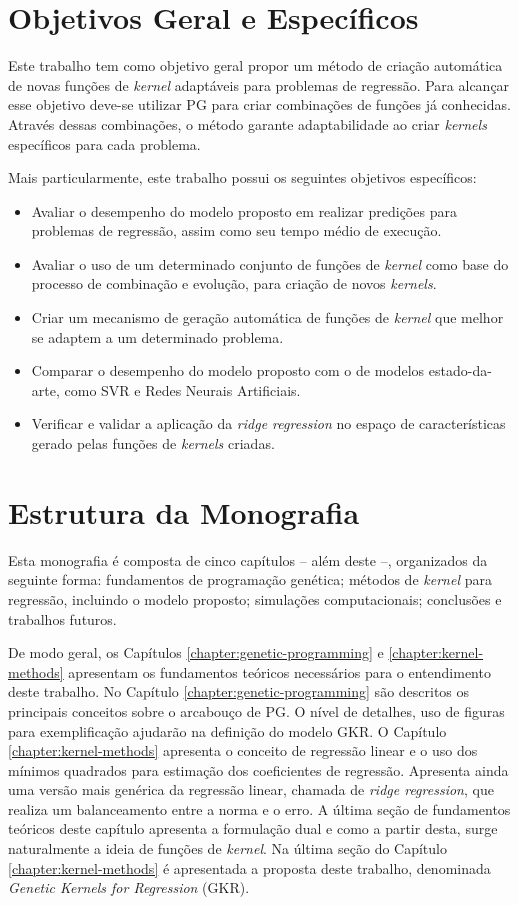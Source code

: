 \section{Objetivos Geral e Específicos}
Este trabalho tem como objetivo geral propor um método de criação automática de novas funções de \textit{kernel} adaptáveis para problemas de regressão. Para alcançar esse objetivo deve-se utilizar PG para criar combinações de funções já conhecidas. Através dessas combinações, o método garante adaptabilidade ao criar \textit{kernels} específicos para cada problema.

Mais particularmente, este trabalho possui os seguintes objetivos específicos:

\begin{itemize}
	\item Avaliar o desempenho do modelo proposto em realizar predições para problemas de regressão, assim como seu tempo médio de execução.
    \item Avaliar o uso de um determinado conjunto de funções de \textit{kernel} como base do processo de combinação e evolução, para criação de novos \textit{kernels}.
    \item Criar um mecanismo de geração automática de funções de \textit{kernel} que melhor se adaptem a um determinado problema.
    \item Comparar o desempenho do modelo proposto com o de modelos estado-da-arte, como SVR e Redes Neurais Artificiais.
    \item Verificar e validar a aplicação da \textit{ridge regression} no espaço de características gerado pelas funções de \textit{kernels} criadas.
\end{itemize}

\section{Estrutura da Monografia}
Esta monografia é composta de cinco capítulos -- além deste --, organizados da seguinte forma: fundamentos de programação genética; métodos de \textit{kernel} para regressão, incluindo o modelo proposto; simulações computacionais; conclusões e trabalhos futuros.

De modo geral, os Capítulos \ref{chapter:genetic-programming} e \ref{chapter:kernel-methods} apresentam os fundamentos teóricos necessários para o entendimento deste trabalho. No Capítulo \ref{chapter:genetic-programming} são descritos os principais conceitos sobre o arcabouço de PG. O nível de detalhes, uso de figuras para exemplificação ajudarão na definição do modelo GKR. O Capítulo \ref{chapter:kernel-methods} apresenta o conceito de regressão linear e o uso dos mínimos quadrados para estimação dos coeficientes de regressão. Apresenta ainda uma versão mais genérica da regressão linear, chamada de \textit{ridge regression}, que realiza um balanceamento entre a norma e o erro. A última seção de fundamentos teóricos deste capítulo apresenta a formulação dual e como a partir desta, surge naturalmente a ideia de funções de \textit{kernel}. Na última seção do Capítulo \ref{chapter:kernel-methods} é apresentada a proposta deste trabalho, denominada \textit{Genetic Kernels for Regression} (GKR).

